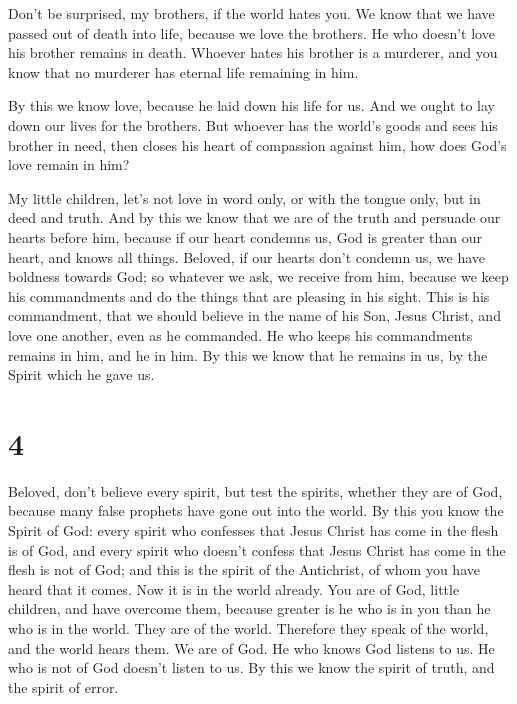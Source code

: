  Don't be surprised, my brothers, if the world hates you.
 We know that we have passed out of death into life,
because we love the brothers. He who doesn't love his brother remains in
death.  Whoever hates his brother is a murderer, and you
know that no murderer has eternal life remaining in him.

 By this we know love, because he laid down his life for
us. And we ought to lay down our lives for the brothers. 
But whoever has the world's goods and sees his brother in need, then
closes his heart of compassion against him, how does God's love remain
in him?

 My little children, let's not love in word only, or with
the tongue only, but in deed and truth.  And by this we
know that we are of the truth and persuade our hearts before him,
 because if our heart condemns us, God is greater than our
heart, and knows all things.  Beloved, if our hearts don't
condemn us, we have boldness towards God;  so whatever we
ask, we receive from him, because we keep his commandments and do the
things that are pleasing in his sight.  This is his
commandment, that we should believe in the name of his Son, Jesus
Christ, and love one another, even as he commanded.  He who
keeps his commandments remains in him, and he in him. By this we know
that he remains in us, by the Spirit which he gave us.

\hypertarget{section-3}{%
\section{4}\label{section-3}}

 Beloved, don't believe every spirit, but test the spirits,
whether they are of God, because many false prophets have gone out into
the world.  By this you know the Spirit of God: every spirit
who confesses that Jesus Christ has come in the flesh is of God,
 and every spirit who doesn't confess that Jesus Christ has
come in the flesh is not of God; and this is the spirit of the
Antichrist, of whom you have heard that it comes. Now it is in the world
already.  You are of God, little children, and have overcome
them, because greater is he who is in you than he who is in the world.
 They are of the world. Therefore they speak of the world,
and the world hears them.  We are of God. He who knows God
listens to us. He who is not of God doesn't listen to us. By this we
know the spirit of truth, and the spirit of error.

